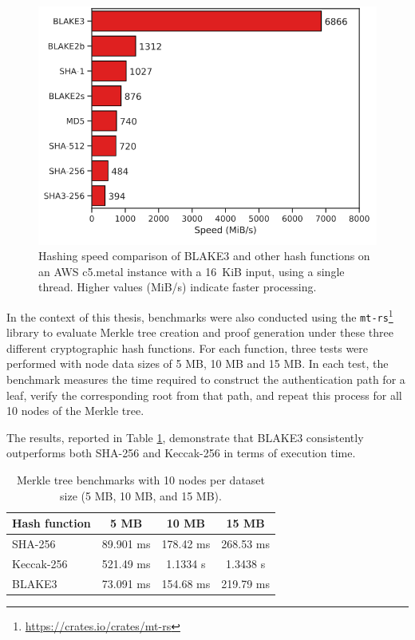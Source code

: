 \begin{figure}
    \centering
    \includegraphics[width=0.7\linewidth]{assets/blake3-speed.png}
    \caption{Hashing speed comparison of BLAKE3 and other hash functions on an AWS c5.metal instance
with a 16~KiB input, using a single thread. Higher values (MiB/s) indicate faster processing.}
    \label{fig:blak3-speed}
\end{figure}

In the context of this thesis, benchmarks were also conducted using the
\texttt{mt-rs}\footnote{\url{https://crates.io/crates/mt-rs}} library to evaluate Merkle tree creation and proof generation under these three different cryptographic hash functions.  
For each function, three tests were performed with node data sizes of 5 MB, 10 MB and 15 MB.  
In each test, the benchmark measures the time required to construct the authentication path for a leaf, verify the corresponding root from that path, and repeat this process for all 10 nodes of the Merkle tree.

The results, reported in Table \ref{tab:benchmarks-hash-functions}, demonstrate that BLAKE3 consistently outperforms both SHA-256 and Keccak-256 in terms of execution time.

\begin{table}[h!]
    \centering
    \begin{tabular}{|l|c|c|c|}
    \hline
       \textbf{Hash function} & \textbf{5 MB} & \textbf{10 MB} & \textbf{15 MB} \\
       \hline
        SHA-256 & 89.901 ms & 178.42 ms & 268.53 ms \\
        Keccak-256 & 521.49 ms & 1.1334 s & 1.3438 s \\
        BLAKE3 & 73.091 ms & 154.68 ms & 219.79 ms \\
        \hline
    \end{tabular}
    \caption{Merkle tree benchmarks with 10 nodes per dataset size (5 MB, 10 MB, and 15 MB).}
    \label{tab:benchmarks-hash-functions}
\end{table}
